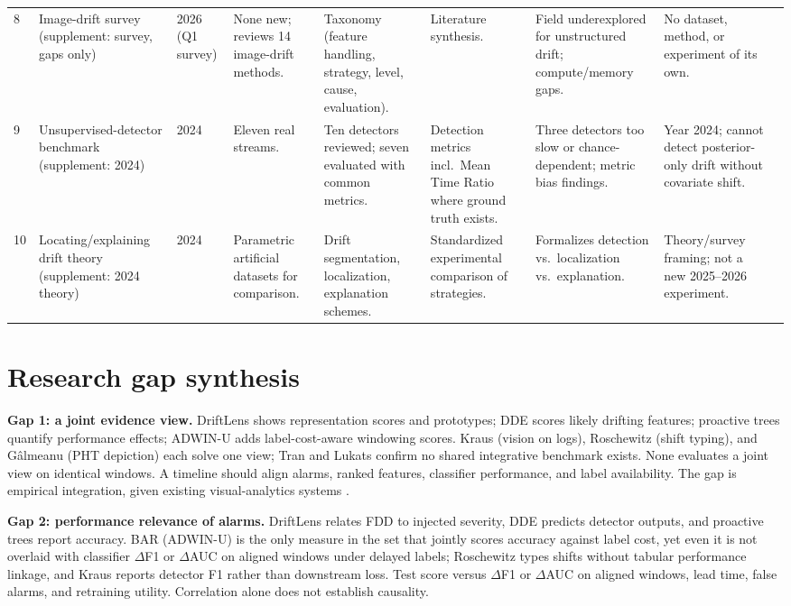 \documentclass[10pt,a4paper]{article}
\begin{document}
\begin{landscape}
\begin{longtable}{L{0.45cm}L{3.05cm}L{1.15cm}L{2.95cm}L{3.05cm}L{2.95cm}L{2.95cm}L{3.0cm}L{3.95cm}}
8 & Image-drift survey (supplement: survey, gaps only) & 2026 (Q1 survey) & None new; reviews 14 image-drift methods. & Taxonomy (feature handling, strategy, level, cause, evaluation). & Literature synthesis. & Field underexplored for unstructured drift; compute/memory gaps. & No dataset, method, or experiment of its own.\\[5pt]
9 & Unsupervised-detector benchmark (supplement: 2024) & 2024 & Eleven real streams. & Ten detectors reviewed; seven evaluated with common metrics. & Detection metrics incl.\ Mean Time Ratio where ground truth exists. & Three detectors too slow or chance-dependent; metric bias findings. & Year 2024; cannot detect posterior-only drift without covariate shift.\\[5pt]
10 & Locating/explaining drift theory (supplement: 2024 theory) & 2024 & Parametric artificial datasets for comparison. & Drift segmentation, localization, explanation schemes. & Standardized experimental comparison of strategies. & Formalizes detection vs.\ localization vs.\ explanation. & Theory/survey framing; not a new 2025--2026 experiment.\\[5pt]
\end{longtable}
\end{landscape}

\section*{Research gap synthesis}
\textbf{Gap 1: a joint evidence view.} DriftLens shows representation scores and prototypes; DDE scores likely drifting features; proactive trees quantify performance effects; ADWIN-U adds label-cost-aware windowing scores. Kraus (vision on logs), Roschewitz (shift typing), and G\^almeanu (PHT depiction) each solve one view; Tran and Lukats confirm no shared integrative benchmark exists. None evaluates a joint view on identical windows. A timeline should align alarms, ranked features, classifier performance, and label availability. The gap is empirical integration, given existing visual-analytics systems \cite{driftvis,conceptexplorer}.

\textbf{Gap 2: performance relevance of alarms.} DriftLens relates FDD to injected severity, DDE predicts detector outputs, and proactive trees report accuracy. BAR (ADWIN-U) is the only measure in the set that jointly scores accuracy against label cost, yet even it is not overlaid with classifier $\Delta$F1 or $\Delta$AUC on aligned windows under delayed labels; Roschewitz types shifts without tabular performance linkage, and Kraus reports detector F1 rather than downstream loss. Test score versus $\Delta$F1 or $\Delta$AUC on aligned windows, lead time, false alarms, and retraining utility. Correlation alone does not establish causality.
\end{document}

